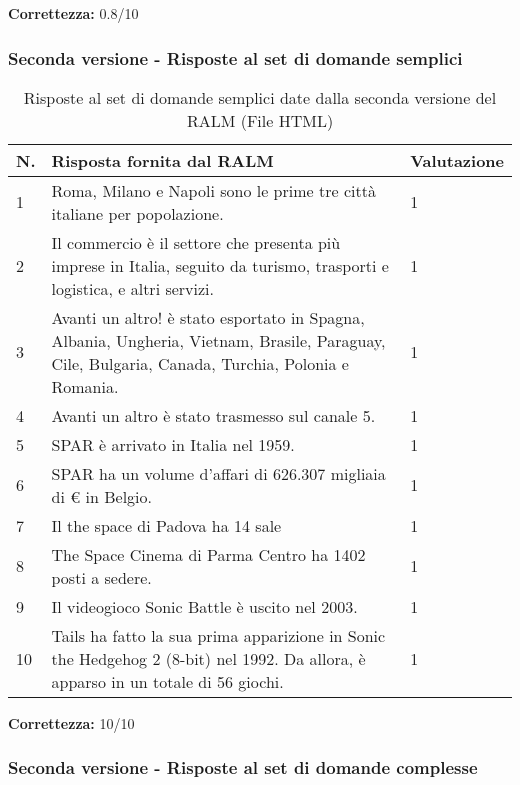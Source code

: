 \textbf{Correttezza:} 0.8/10

\subsubsection{Seconda versione - Risposte al set di domande semplici}

\begin{table}[H]
    \centering
    \begin{tabular}{|p{0.5cm} |p{6cm} |p{2cm}|}
        \hline
        \textbf{N}. & \textbf{Risposta fornita dal RALM} & \textbf{Valutazione} \\
        \hline
        1 & Roma, Milano e Napoli sono le prime tre città italiane per popolazione. & 1 \\
        \hline
        2 & Il commercio è il settore che presenta più imprese in Italia, seguito da turismo, trasporti e logistica, e altri servizi. & 1 \\
        \hline
        3 & Avanti un altro! è stato esportato in Spagna, Albania, Ungheria, Vietnam, Brasile, Paraguay, Cile, Bulgaria, Canada, Turchia, Polonia e Romania. & 1 \\
        \hline
        4 & Avanti un altro è stato trasmesso sul canale 5. & 1 \\
        \hline
        5 & SPAR è arrivato in Italia nel 1959. & 1 \\
        \hline
        6 & SPAR ha un volume d'affari di 626.307 migliaia di € in Belgio. & 1 \\
        \hline
        7 & Il the space di Padova ha 14 sale & 1 \\
        \hline
        8 & The Space Cinema di Parma Centro ha 1402 posti a sedere. & 1 \\
        \hline
        9 & Il videogioco Sonic Battle è uscito nel 2003. & 1 \\
        \hline
        10 & Tails ha fatto la sua prima apparizione in Sonic the Hedgehog 2 (8-bit) nel 1992. Da allora, è apparso in un totale di 56 giochi. & 1 \\
        \hline
    \end{tabular}
    \caption{Risposte al set di domande semplici date dalla seconda versione del RALM (File HTML)}
\end{table}

\textbf{Correttezza:} 10/10

\subsubsection{Seconda versione - Risposte al set di domande complesse}

